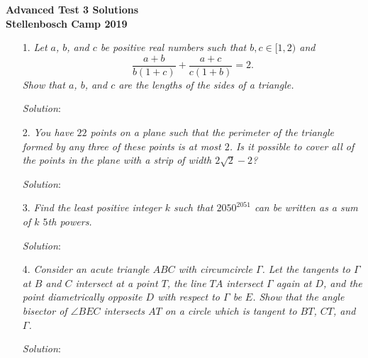 \documentclass{article}
\begin{document}
\begin{center}
  \textbf{\Large Advanced Test 3 Solutions}
  \\ \vspace{1em}
  \textbf{\large Stellenbosch Camp 2019}
\end{center}

\vspace{12pt}


\begin{enumerate}

\item[1.] %
{\itshape
Let $a$, $b$, and $c$ be positive real numbers such that $b, c \in [1,2)$ and
\[ \frac{a+b}{b(1+c)} +\frac{a+c}{c(1+b)} = 2. \]
Show that $a$, $b$, and $c$ are the lengths of the sides of a triangle. 
}

\textit{Solution}:


\item[2.] %
{\itshape
You have $22$ points on a plane such that the perimeter of the triangle formed by any three of these points is at most $2$. Is it possible to cover all of the points in the plane with a strip of width $2\sqrt{2} - 2$?
}

\textit{Solution}:


\item[3.] %
{\itshape
Find the least positive integer $k$ such that $2050^{2051}$ can be written as a sum of $k$ $5$th powers.
}

\textit{Solution}:


\item[4.] %
{\itshape
Consider an acute triangle $ABC$ with circumcircle $\Gamma$.
Let the tangents to $\Gamma$ at $B$ and $C$ intersect at a point $T$, the line $TA$ intersect $\Gamma$ again at $D$, and the point diametrically opposite $D$ with respect to $\Gamma$ be $E$.
Show that the angle bisector of $\angle BEC$ intersects $AT$ on a circle which is tangent to $BT$, $CT$, and $\Gamma$.
}

\textit{Solution}:


\end{enumerate}
\end{document}
